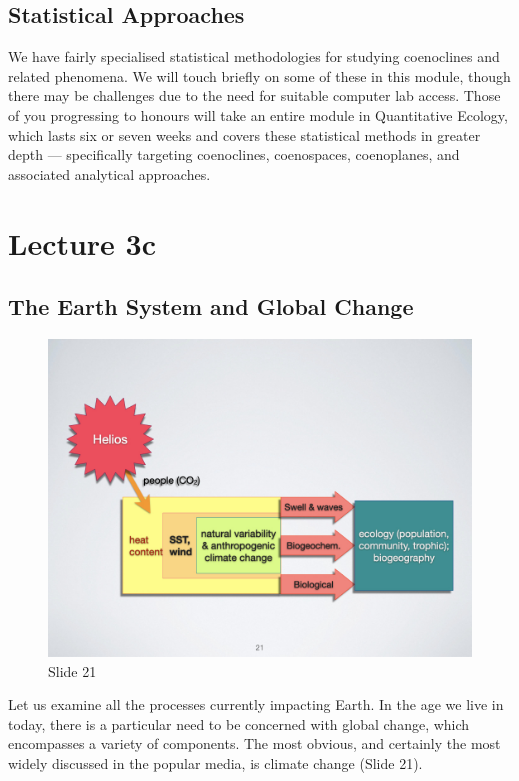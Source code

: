 \documentclass[
  11pt,
]{book}
\begin{document}
\section{Statistical Approaches}\label{statistical-approaches}

We have fairly specialised statistical methodologies for studying
coenoclines and related phenomena. We will touch briefly on some of
these in this module, though there may be challenges due to the need for
suitable computer lab access. Those of you progressing to honours will
take an entire module in Quantitative Ecology, which lasts six or seven
weeks and covers these statistical methods in greater depth ---
specifically targeting coenoclines, coenospaces, coenoplanes, and
associated analytical approaches.

\chapter*{Lecture 3c}\label{lecture-3c}

\section{The Earth System and Global
Change}\label{the-earth-system-and-global-change}

\begin{figure}[ht]
\centering
\includegraphics[width=0.8\linewidth]{../images/BDC334/BDC334-021.jpeg}
\caption*{Slide 21}
\end{figure}

Let us examine all the processes currently impacting Earth. In the age
we live in today, there is a particular need to be concerned with global
change, which encompasses a variety of components. The most obvious, and
certainly the most widely discussed in the popular media, is climate
change (Slide 21).
\end{document}
